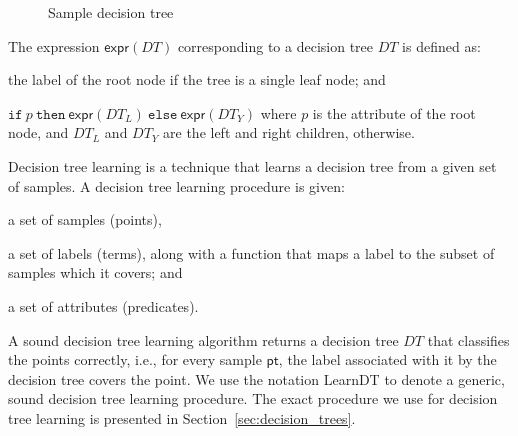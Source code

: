 \documentclass{llncs}
\newcommand\Point{\mathsf{pt}}
\newcommand\Pred{p}
\newcommand\ITE[3]{\mathtt{if}~#1~\mathtt{then}~#2~\mathtt{else}~#3}
\newcommand\DecisionTree{\mathit{DT}}
\newcommand\DTtoExpr[1]{\mathsf{expr}(#1)}
\newcommand\node{v}
\begin{document}
\begin{wrapfigure}{l}{0.33\textwidth}
  \centering
  \vspace*{1pt}
  \caption{Sample decision tree}
  \label{fig:dt}
\end{wrapfigure}
\noindent
The expression $\DTtoExpr{\DecisionTree}$ corresponding to a
decision tree $\DecisionTree$ is defined as:
\begin{inparaenum}[(a)]
\item the label of the root node if the tree is a single leaf node; and
\item
  $\ITE{\Pred}{\DTtoExpr{\DecisionTree_L}}{\DTtoExpr{\DecisionTree_Y}}$
  where $\Pred$ is the attribute of the root node, and $\DecisionTree_L$ and
  $\DecisionTree_Y$ are the left and right children, otherwise.
\end{inparaenum}

\noindent
Decision tree learning is a technique that learns a decision tree from a
given set of samples.
A decision tree learning procedure is given:
\begin{inparaenum}[(a)]
\item a set of samples (points),
\item a set of labels (terms), along with a function that maps a label to the
  subset of samples which it covers; and
\item a set of attributes (predicates).
\end{inparaenum}
A sound decision tree learning algorithm returns a decision tree
$\DecisionTree$ that classifies the points correctly, i.e., for every
sample $\Point$, the label associated with it by the decision tree covers
the point.
We use the notation {\sc LearnDT} to denote a generic, sound
decision tree learning procedure.
The exact procedure we use for decision tree learning is presented in
Section~\ref{sec:decision_trees}.
\end{document}
